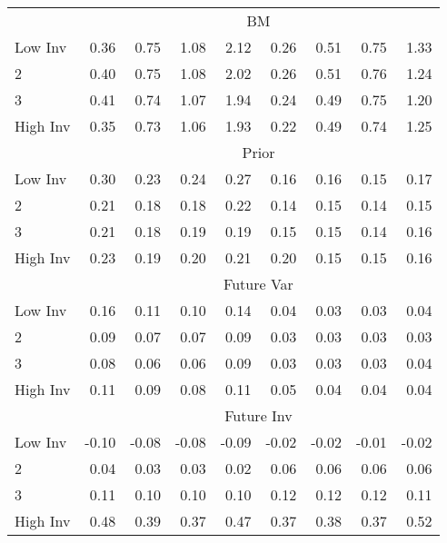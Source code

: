 \begin{table}[!ht]
\begin{tabular}{lrrrrrrrr}
  
    & \multicolumn{8}{c}{BM}  \\
     \cmidrule(r){2-5} \cmidrule(r){6-9}
    Low Inv  & 0.36  & 0.75  & 1.08  & 2.12  & 0.26  & 0.51  & 0.75  & 1.33   \\
    2  & 0.40  & 0.75  & 1.08  & 2.02  & 0.26  & 0.51  & 0.76  & 1.24   \\
    3  & 0.41  & 0.74  & 1.07  & 1.94  & 0.24  & 0.49  & 0.75  & 1.20   \\
    High Inv  & 0.35  & 0.73  & 1.06  & 1.93  & 0.22  & 0.49  & 0.74  & 1.25   \\
    
  
    & \multicolumn{8}{c}{Prior}  \\
     \cmidrule(r){2-5} \cmidrule(r){6-9}
    Low Inv  & 0.30  & 0.23  & 0.24  & 0.27  & 0.16  & 0.16  & 0.15  & 0.17   \\
    2  & 0.21  & 0.18  & 0.18  & 0.22  & 0.14  & 0.15  & 0.14  & 0.15   \\
    3  & 0.21  & 0.18  & 0.19  & 0.19  & 0.15  & 0.15  & 0.14  & 0.16   \\
    High Inv  & 0.23  & 0.19  & 0.20  & 0.21  & 0.20  & 0.15  & 0.15  & 0.16   \\
    
  
  
    & \multicolumn{8}{c}{Future Var}  \\
     \cmidrule(r){2-5} \cmidrule(r){6-9}
    Low Inv  & 0.16  & 0.11  & 0.10  & 0.14  & 0.04  & 0.03  & 0.03  & 0.04   \\
    2  & 0.09  & 0.07  & 0.07  & 0.09  & 0.03  & 0.03  & 0.03  & 0.03   \\
    3  & 0.08  & 0.06  & 0.06  & 0.09  & 0.03  & 0.03  & 0.03  & 0.04   \\
    High Inv  & 0.11  & 0.09  & 0.08  & 0.11  & 0.05  & 0.04  & 0.04  & 0.04   \\
  
    & \multicolumn{8}{c}{Future Inv}  \\
     \cmidrule(r){2-5} \cmidrule(r){6-9}
    Low Inv  & -0.10  & -0.08  & -0.08  & -0.09  & -0.02  & -0.02  & -0.01  & -0.02   \\
    2  & 0.04  & 0.03  & 0.03  & 0.02  & 0.06  & 0.06  & 0.06  & 0.06   \\
    3  & 0.11  & 0.10  & 0.10  & 0.10  & 0.12  & 0.12  & 0.12  & 0.11   \\
    High Inv  & 0.48  & 0.39  & 0.37  & 0.47  & 0.37  & 0.38  & 0.37  & 0.52   \\
    

\end{tabular}
\end{table}
